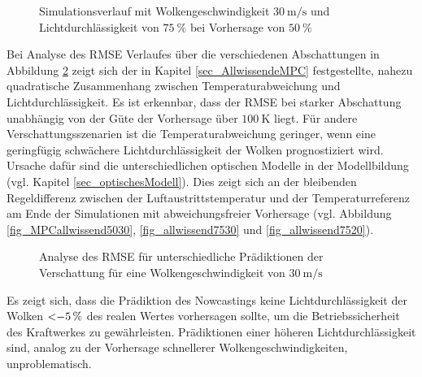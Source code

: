 \begin{figure}[h!]
    \centering
    \setlength{\fboxsep}{1pt}
    \setlength{\fboxrule}{1pt}
    \caption[Simulationsverlauf mit Wolkengeschwindigkeit $\SI{30}{\metre\per\second}$ und Lichtdurchlässigkeit von $\SI{75}{\percent}$ bei Vorhersage von $\SI{50}{\percent}$]{Simulationsverlauf mit Wolkengeschwindigkeit $\SI{30}{\metre\per\second}$ und Lichtdurchlässigkeit von $\SI{75}{\percent}$ bei Vorhersage von $\SI{50}{\percent}$}
    \label{fig_uncertain753050}
\end{figure}

Bei Analyse des RMSE Verlaufes über die verschiedenen Abschattungen in Abbildung \ref{fig_shadingrmse} zeigt sich der in Kapitel \ref{sec_AllwissendeMPC} festgestellte, nahezu quadratische Zusammenhang zwischen Temperaturabweichung und Lichtdurchlässigkeit.
Es ist erkennbar, dass der RMSE bei starker Abschattung unabhängig von der Güte der Vorhersage über $\SI{100}{\kelvin}$ liegt.
Für andere Verschattungsszenarien ist die Temperaturabweichung geringer, wenn eine geringfügig schwächere Lichtdurchlässigkeit der Wolken prognostiziert wird.
Ursache dafür sind die unterschiedlichen optischen Modelle in der Modellbildung (vgl. Kapitel \ref{sec_optischesModell}).
Dies zeigt sich an der bleibenden Regeldifferenz zwischen der Luftaustrittstemperatur und der Temperaturreferenz am Ende der Simulationen mit abweichungsfreier Vorhersage (vgl. Abbildung \ref{fig_MPCallwissend5030}, \ref{fig_allwissend7530} und \ref{fig_allwissend7520}).\pagebreak

\begin{figure}[t]
    \centering
    \setlength{\fboxsep}{1pt}
    \setlength{\fboxrule}{1pt}
    \caption[Analyse des RMSE für unterschiedliche Prädiktionen der Verschattung für eine Wolkengeschwindigkeit von $\SI{30}{\metre\per\second}$]{Analyse des RMSE für unterschiedliche Prädiktionen der Verschattung für eine Wolkengeschwindigkeit von $\SI{30}{\metre\per\second}$}
    \label{fig_shadingrmse}
\end{figure}

Es zeigt sich, dass die Prädiktion des Nowcastings keine Lichtdurchlässigkeit der Wolken $\SI{<-5}{\percent}$ des realen Wertes vorhersagen sollte, um die Betriebssicherheit des Kraftwerkes zu gewährleisten.
Prädiktionen einer höheren Lichtdurchlässigkeit sind, analog zu der Vorhersage schnellerer Wolkengeschwindigkeiten, unproblematisch.
